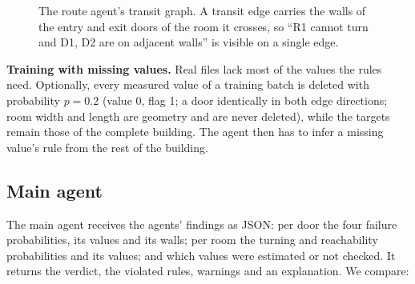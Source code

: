 \documentclass[conference]{IEEEtran}
\begin{document}
\begin{figure}[t]
\centering
{}
\caption{The route agent's transit graph. A transit edge carries the walls of the entry and exit doors of the room
it crosses, so ``R1 cannot turn and D1, D2 are on adjacent walls'' is visible on a single edge.}
\label{fig:transit}
\end{figure}

\textbf{Training with missing values.} Real files lack most of the values the rules need. Optionally, every
measured value of a training batch is deleted with probability $p=0.2$ (value 0, flag 1; a door identically in both
edge directions; room width and length are geometry and are never deleted), while the targets remain those of the
complete building. The agent then has to infer a missing value's rule from the rest of the building.

\subsection{Main agent}

The main agent receives the agents' findings as JSON: per door the four failure probabilities, its values and its
walls; per room the turning and reachability probabilities and its values; and which values were estimated or not
checked. It returns the verdict, the violated rules, warnings and an explanation. We compare:
\end{document}
